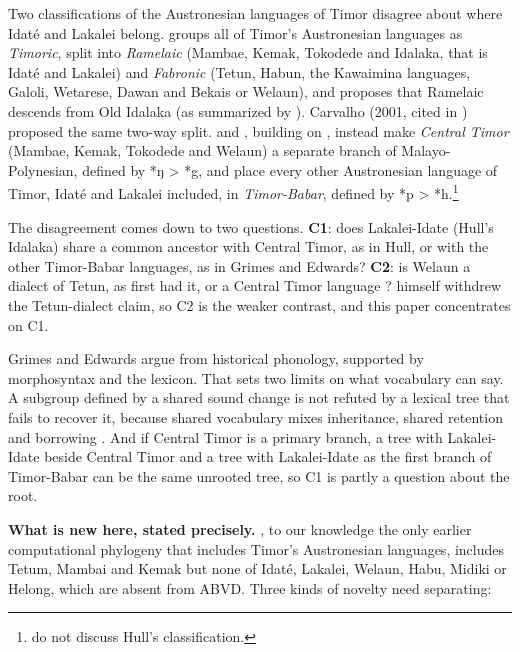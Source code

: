 \documentclass[11pt]{article}
\begin{document}
Two classifications of the Austronesian languages of Timor disagree about where Idaté and Lakalei belong. \citet{hull1998,hull2001a} groups all of Timor's Austronesian languages as \emph{Timoric}, split into \emph{Ramelaic} (Mambae, Kemak, Tokodede and Idalaka, that is Idaté and Lakalei) and \emph{Fabronic} (Tetun, Habun, the Kawaimina languages, Galoli, Wetarese, Dawan and Bekais or Welaun), and proposes that Ramelaic descends from Old Idalaka (as summarized by \citealt{albuquerque2009}). Carvalho (2001, cited in \citealt{fogaca2015}) proposed the same two-way split. \citet{edwards2019,edwards2021} and \citet{grimes2026}, building on \citet{donohue2008}, instead make \emph{Central Timor} (Mambae, Kemak, Tokodede and Welaun) a separate branch of Malayo-Polynesian, defined by *ŋ \textgreater{} *g, and place every other Austronesian language of Timor, Idaté and Lakalei included, in \emph{Timor-Babar}, defined by *p \textgreater{} *h.\footnote{\citet{grimes2026} do not discuss Hull's classification.}

The disagreement comes down to two questions. \textbf{C1}: does Lakalei-Idate (Hull's Idalaka) share a common ancestor with Central Timor, as in Hull, or with the other Timor-Babar languages, as in Grimes and Edwards? \textbf{C2}: is Welaun a dialect of Tetun, as \citet{hull1998} first had it, or a Central Timor language \citep{edwards2019}? \citet{hull2003} himself withdrew the Tetun-dialect claim, so C2 is the weaker contrast, and this paper concentrates on C1.

Grimes and Edwards argue from historical phonology, supported by morphosyntax and the lexicon. That sets two limits on what vocabulary can say. A subgroup defined by a shared sound change is not refuted by a lexical tree that fails to recover it, because shared vocabulary mixes inheritance, shared retention and borrowing \citep{blust2000,heggarty2010}. And if Central Timor is a primary branch, a tree with Lakalei-Idate beside Central Timor and a tree with Lakalei-Idate as the first branch of Timor-Babar can be the same unrooted tree, so C1 is partly a question about the root.

\textbf{What is new here, stated precisely.} \citet{gray2009}, to our knowledge the only earlier computational phylogeny that includes Timor's Austronesian languages, includes Tetum, Mambai and Kemak but none of Idaté, Lakalei, Welaun, Habu, Midiki or Helong, which are absent from ABVD. Three kinds of novelty need separating:
\end{document}
